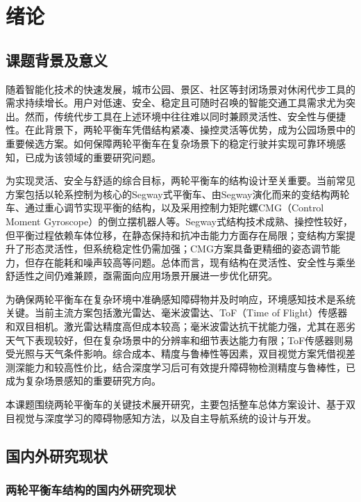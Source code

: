 ﻿%

\chapter{绪论}

\section{课题背景及意义}

随着智能化技术的快速发展，城市公园、景区、社区等封闭场景对休闲代步工具的需求持续增长。用户对低速、安全、稳定且可随时召唤的智能交通工具需求尤为突出。然而，传统代步工具在上述环境中往往难以同时兼顾灵活性、安全性与便捷性。在此背景下，两轮平衡车凭借结构紧凑、操控灵活等优势，成为公园场景中的重要候选方案。如何保障两轮平衡车在复杂场景下的稳定行驶并实现可靠环境感知，已成为该领域的重要研究问题。

为实现灵活、安全与舒适的综合目标，两轮平衡车的结构设计至关重要。当前常见方案包括以轮系控制为核心的Segway式平衡车、由Segway演化而来的变结构两轮车、通过重心调节实现平衡的结构，以及采用控制力矩陀螺CMG（Control Moment Gyroscope）的倒立摆机器人等。Segway式结构技术成熟、操控性较好，但平衡过程依赖车体位移，在静态保持和抗冲击能力方面存在局限；变结构方案提升了形态灵活性，但系统稳定性仍需加强；CMG方案具备更精细的姿态调节能力，但存在能耗和噪声较高等问题。总体而言，现有结构在灵活性、安全性与乘坐舒适性之间仍难兼顾，亟需面向应用场景开展进一步优化研究。

为确保两轮平衡车在复杂环境中准确感知障碍物并及时响应，环境感知技术是系统关键。当前主流方案包括激光雷达、毫米波雷达、ToF（Time of Flight）传感器和双目相机。激光雷达精度高但成本较高；毫米波雷达抗干扰能力强，尤其在恶劣天气下表现较好，但在复杂场景中的分辨率和细节表达能力有限；ToF传感器则易受光照与天气条件影响。综合成本、精度与鲁棒性等因素，双目视觉方案凭借视差测深能力和较高性价比，结合深度学习后可有效提升障碍物检测精度与鲁棒性，已成为复杂场景感知的重要研究方向。

本课题围绕两轮平衡车的关键技术展开研究，主要包括整车总体方案设计、基于双目视觉与深度学习的障碍物感知方法，以及自主导航系统的设计与开发。

\section{国内外研究现状}
\subsection{两轮平衡车结构的国内外研究现状}

